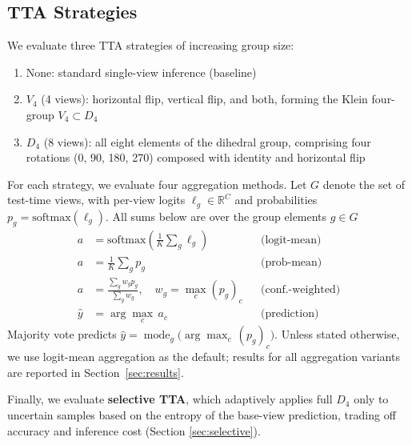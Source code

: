 \documentclass{melba}
\begin{document}
\subsection{TTA Strategies}

We evaluate three TTA strategies of increasing group size:

\begin{enumerate}
  \item None: standard single-view inference (baseline)
  \item \textbf{$V_4$} (4 views): horizontal flip, vertical flip, and both, forming the Klein four-group $V_4 \subset D_4$
  \item \textbf{{$D_4$}} (8 views): all eight elements of the dihedral group, comprising four rotations (0\textdegree, 90\textdegree, 180\textdegree, 270\textdegree) composed with identity and horizontal flip
\end{enumerate}

For each strategy, we evaluate four aggregation methods. Let $G$ denote the set of test-time views, with per-view logits $\ell_g\in\mathbb{R}^C$ and probabilities $p_g=\mathrm{softmax}(\ell_g)$. All sums below are over the group elements $g\in G$
\begin{equation*}
\begin{aligned}
  a &= \mathrm{softmax}\!\left(\frac{1}{K}\sum_{g} \ell_g\right) && \text{(logit-mean)}\\
  a &= \frac{1}{K}\sum_{g} p_g && \text{(prob-mean)}\\
  a &= \frac{\sum_{g} w_g p_g}{\sum_{g} w_g}, \quad w_g = \max_{c}(p_g)_c && \text{(conf.-weighted)}\\
  \hat{y} &= \arg\max_{c}\, a_c && \text{(prediction)}
\end{aligned}
\end{equation*}
Majority vote predicts $\hat{y}=\operatorname*{mode}_{g}\bigl(\arg\max_{c}\,(p_g)_c\bigr)$.
Unless stated otherwise, we use logit-mean aggregation as the default; results for all aggregation variants are reported in Section~\ref{sec:results}.

Finally, we evaluate \textbf{selective TTA}, which adaptively applies full $D_4$ only to uncertain samples based on the entropy of the base-view prediction, trading off accuracy and inference cost (Section \ref{sec:selective}).
\end{document}
